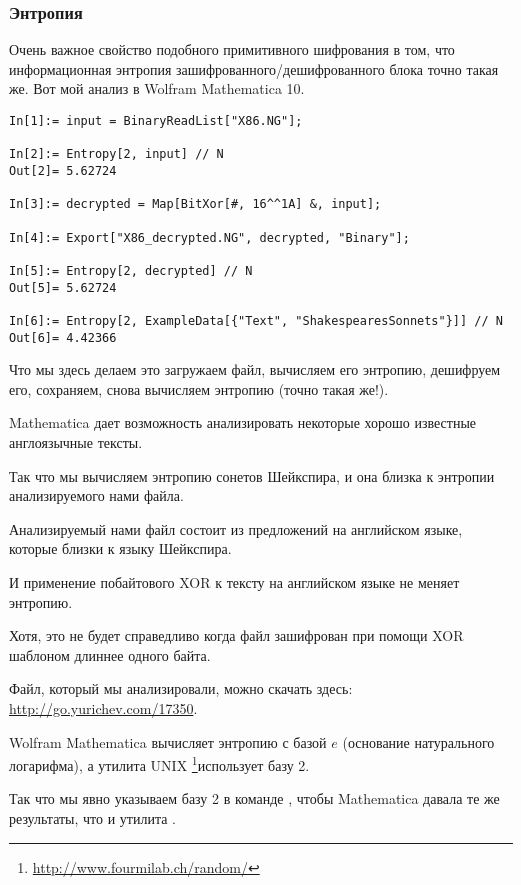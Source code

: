 \subsubsection{Энтропия}

Очень важное свойство подобного примитивного шифрования в том, что информационная энтропия
зашифрованного/дешифрованного блока точно такая же.
Вот мой анализ в Wolfram Mathematica 10.

\begin{lstlisting}[caption=Wolfram Mathematica 10,style=custommath]
In[1]:= input = BinaryReadList["X86.NG"];

In[2]:= Entropy[2, input] // N
Out[2]= 5.62724

In[3]:= decrypted = Map[BitXor[#, 16^^1A] &, input];

In[4]:= Export["X86_decrypted.NG", decrypted, "Binary"];

In[5]:= Entropy[2, decrypted] // N
Out[5]= 5.62724

In[6]:= Entropy[2, ExampleData[{"Text", "ShakespearesSonnets"}]] // N
Out[6]= 4.42366
\end{lstlisting}

Что мы здесь делаем это загружаем файл, вычисляем его энтропию, дешифруем его, сохраняем, снова вычисляем энтропию (точно такая же!).

Mathematica дает возможность анализировать некоторые хорошо известные англоязычные тексты.

Так что мы вычисляем энтропию сонетов Шейкспира, и она близка к энтропии анализируемого нами файла.

Анализируемый нами файл состоит из предложений на английском языке, которые близки к языку
Шейкспира.

И применение побайтового XOR к тексту на английском языке не меняет энтропию.


Хотя, это не будет справедливо когда файл зашифрован при помощи XOR шаблоном длиннее одного байта.

Файл, который мы анализировали, можно скачать здесь: \url{http://go.yurichev.com/17350}.


\newcommand{\FNENTURL}{\footnote{\url{http://www.fourmilab.ch/random/}}}

Wolfram Mathematica вычисляет энтропию с базой $e$ (основание натурального логарифма),
а утилита UNIX \FNENTURL использует базу 2.

Так что мы явно указываем базу 2 в команде , чтобы Mathematica давала те же результаты, что и утилита .
